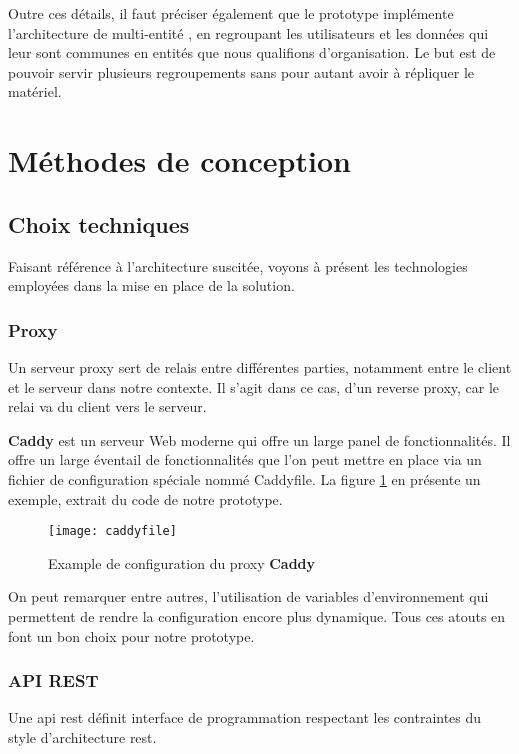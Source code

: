 Outre ces détails, il faut préciser également que le prototype implémente l’architecture de multi-entité \cite{multitenancy}, 
en regroupant les utilisateurs et les données qui leur sont communes en entités que nous qualifions d’organisation. 
Le but est de pouvoir servir plusieurs regroupements sans pour autant avoir à répliquer le matériel. 

\section{Méthodes de conception}
\subsection{Choix techniques}
Faisant référence à l’architecture suscitée, 
voyons à présent les technologies employées dans la mise en place de la solution.

\subsubsection{Proxy}
Un serveur proxy sert de relais entre différentes parties, notamment entre le client et le serveur dans notre contexte. 
Il s’agit dans ce cas, d’un reverse proxy, car le relai va du client vers le serveur.
 
\textbf{Caddy} est un serveur Web moderne qui offre un large panel de fonctionnalités. 
Il offre un large éventail de fonctionnalités que l’on peut mettre en place via un fichier de configuration spéciale nommé Caddyfile. 
La figure \ref{fig:caddyfile} en présente un exemple, extrait du code de notre prototype.


\begin{figure}[H]
  \centering
  \texttt{[image: caddyfile]}
  \caption{Example de configuration du proxy \textbf{Caddy}}
  \label{fig:caddyfile}
\end{figure}

On peut remarquer entre autres, l’utilisation de variables d’environnement qui permettent de rendre la configuration encore plus dynamique. 
Tous ces atouts en font un bon choix pour notre prototype.

\subsubsection{API REST}

Une \acrshort{api} \acrshort{rest} définit interface de programmation respectant les contraintes du style d’architecture \acrlong{rest}.

